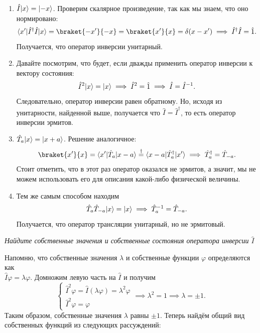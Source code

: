 \begin{enumerate}
  \item $\hat I \lvert x\rangle = \lvert-x\rangle$. Проверим скалярное произведение, так как мы знаем,
        что оно нормировано:
        \[
          \bra{x'}\hat{I}^{\dagger}\hat{I}\ket{x} = \braket{-x'}{-x} =\braket{x'}{x} = \delta(x-x')
          \implies \hat{I}^{\dagger}\hat{I} = \hat{1}.
        \]
        Получается, что оператор инверсии унитарный.

  \item Давайте посмотрим, что будет, если дважды применить оператор инверсии к вектору
        состояния:
        \[
          \hat I^2 \lvert x\rangle = \lvert x\rangle \implies \hat I^2 = \hat 1 \implies \hat{I} = \hat{I}^{-1}.
        \]
        Следовательно, оператор инверсии равен обратному. Но, исходя из унитарности,
        найденной выше, получается что $\hat{I} = \hat{I}^{\dagger}$, то есть оператор
        инверсии эрмитов.
  \item $\hat T_a \lvert x\rangle = \lvert x+a\rangle$. Решение аналогичное:
        \[
          \braket{x'}{x} = \bra{x'}\hat{T}_a\ket{x-a} \overset{\dagger}{=} \bra{x-a}\hat{T}^{\dagger}_a\ket{x'} \implies \hat{T}^{\dagger}_{a} = \hat{T}_{-a}.
        \]
        Стоит отметить, что в этот раз оператор оказался не эрмитов, а значит, мы не
        можем использовать его для описания какой-либо физической величины.

  \item Тем же самым способом находим
        \[
          \hat T_a \hat T_{-a} \lvert x\rangle = \lvert x\rangle \implies \hat T_a^{-1} = \hat T_{-a}.
        \]
        Получается, что оператор трансляции унитарный, но не эрмитовый.
\end{enumerate}
\qedsq
\begin{exercise}
  \textit{Найдите собственные значения и собственные состояния оператора инверсии
    $\hat I$}
\end{exercise}
Напомню, что собственные значения $\lambda$ и собственные функции $\varphi$
определяются как \\ $\hat I \varphi = \lambda \varphi$. Домножим левую часть на
$\hat I$ и получим
\[
  \begin{cases}
    \hat I^2 \varphi = \hat I(\lambda \varphi) = \lambda^2 \varphi \\
    \hat I^2 \varphi = \varphi
  \end{cases}
  \implies \lambda^2 = 1 \implies \lambda = \pm 1.
\]
Таким образом, собственные значения $\lambda$ равны $\pm 1$. Теперь найдём
общий вид собственных функций из следующих рассуждений:
